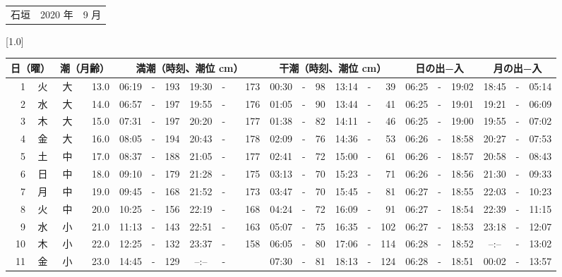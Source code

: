 \documentclass[12pt,a4j]{jsarticle}
\begin{document}
 \begin{table}[htbp]
 \begin{center}
 \begin{tabular}{lcc}
 \LARGE{石垣}  & \large{2020 年} & \large{ 9 月} \\
 \end{tabular}
 \end{center}
 \begin{center}
    \scalebox{0.7}[1.0]{
    \begin{tabular}{|rc|cr|ccrccr|ccrccr|ccc|ccc|}
    \hline
    \multicolumn{2}{|c|}{日（曜）} & \multicolumn{2}{c|}{潮（月齢）} & \multicolumn{6}{c|}{満潮（時刻、潮位 cm）} & \multicolumn{6}{c|}{干潮（時刻、潮位 cm）} & \multicolumn{3}{c|}{日の出−入} &  \multicolumn{3}{c|}{月の出−入}\\
 \hline
 1 & 火 & 大 & 13.0 &  06:19 &-& 193 &  19:30 &-& 173 &  00:30 &-&  98 &  13:14 &-&  39 & 06:25 & -& 19:02 & 18:45 & -& 05:14 \\
 2 & 水 & 大 & 14.0 &  06:57 &-& 197 &  19:55 &-& 176 &  01:05 &-&  90 &  13:44 &-&  41 & 06:25 & -& 19:01 & 19:21 & -& 06:09 \\
 3 & 木 & 大 & 15.0 &  07:31 &-& 197 &  20:20 &-& 177 &  01:38 &-&  82 &  14:11 &-&  46 & 06:25 & -& 19:00 & 19:55 & -& 07:02 \\
 4 & 金 & 大 & 16.0 &  08:05 &-& 194 &  20:43 &-& 178 &  02:09 &-&  76 &  14:36 &-&  53 & 06:26 & -& 18:58 & 20:27 & -& 07:53 \\
 5 & 土 & 中 & 17.0 &  08:37 &-& 188 &  21:05 &-& 177 &  02:41 &-&  72 &  15:00 &-&  61 & 06:26 & -& 18:57 & 20:58 & -& 08:43 \\
 6 & 日 & 中 & 18.0 &  09:10 &-& 179 &  21:28 &-& 175 &  03:13 &-&  70 &  15:23 &-&  71 & 06:26 & -& 18:56 & 21:30 & -& 09:33 \\
 7 & 月 & 中 & 19.0 &  09:45 &-& 168 &  21:52 &-& 173 &  03:47 &-&  70 &  15:45 &-&  81 & 06:27 & -& 18:55 & 22:03 & -& 10:23 \\
 8 & 火 & 中 & 20.0 &  10:25 &-& 156 &  22:19 &-& 168 &  04:24 &-&  72 &  16:09 &-&  91 & 06:27 & -& 18:54 & 22:39 & -& 11:15 \\
 9 & 水 & 小 & 21.0 &  11:13 &-& 143 &  22:51 &-& 163 &  05:07 &-&  75 &  16:35 &-& 102 & 06:27 & -& 18:53 & 23:18 & -& 12:07 \\
10 & 木 & 小 & 22.0 &  12:25 &-& 132 &  23:37 &-& 158 &  06:05 &-&  80 &  17:06 &-& 114 & 06:28 & -& 18:52 & --:-- & -& 13:02 \\
11 & 金 & 小 & 23.0 &  14:45 &-& 129 &  --:-- &-&~~~~~ &  07:30 &-&  81 &  18:13 &-& 124 & 06:28 & -& 18:51 & 00:02 & -& 13:57 \\

\end{tabular}}
\end{center}
\end{table}
\end{document}
